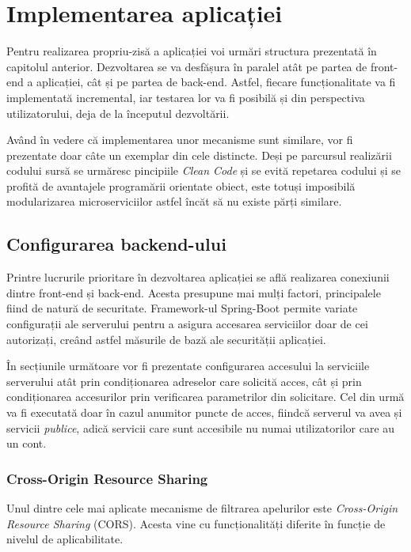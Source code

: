 \documentclass[12pt,a4paper]{report}
\theoremstyle{definition}
\theoremstyle{remark}
\begin{document}
\chapter{Implementarea aplicației}
\par Pentru realizarea propriu-zisă a aplicației voi urmări structura prezentată în capitolul anterior. Dezvoltarea se va desfășura în paralel atât pe partea de front-end a aplicației, cât și pe partea de back-end. Astfel, fiecare funcționalitate va fi implementată incremental, iar testarea lor va fi posibilă și din perspectiva utilizatorului, deja de la începutul dezvoltării.

\par Având în vedere că implementarea unor mecanisme sunt similare, vor fi prezentate doar câte un exemplar din cele distincte. Deși pe parcursul realizării codului sursă se urmăresc pincipiile \textit{Clean Code}\cite{martin2009clean} și se evită repetarea codului și se profită de avantajele programării orientate obiect, este totuși imposibilă modularizarea microserviciilor astfel încăt să nu existe părți similare.

\section{Configurarea backend-ului}
\par Printre lucrurile prioritare în dezvoltarea aplicației se află realizarea conexiunii dintre front-end și back-end. Acesta presupune mai mulți factori, principalele fiind de natură de securitate. Framework-ul Spring-Boot permite variate configurații ale serverului pentru a asigura accesarea serviciilor doar de cei autorizați, creând astfel măsurile de bază ale securității aplicației\cite{scarioni2019pro}.

\par În secțiunile următoare vor fi prezentate configurarea accesului la serviciile serverului atât prin condiționarea adreselor care solicită acces, cât și prin condiționarea accesurilor prin verificarea parametrilor din solicitare. Cel din urmă va fi executată doar în cazul anumitor puncte de acces, fiindcă serverul va avea și servicii \textit{publice}, adică servicii care sunt accesibile nu numai utilizatorilor care au un cont.

\subsection{Cross-Origin Resource Sharing}
\par Unul dintre cele mai aplicate mecanisme de filtrarea apelurilor este \textit{Cross-Origin Resource Sharing}\cite{gibbinscross} (CORS). Acesta vine cu funcționalități diferite în funcție de nivelul de aplicabilitate.
\end{document}
